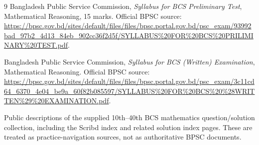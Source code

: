 \documentclass[12pt,a4paper,oneside]{book}
\begin{document}
\begin{thebibliography}{9}
Bangladesh Public Service Commission, \emph{Syllabus for BCS Preliminary Test}, Mathematical Reasoning, 15 marks. Official BPSC source: \url{https://bpsc.gov.bd/sites/default/files/files/bpsc.portal.gov.bd/psc_exam/93992bad_97b2_4d13_84eb_902cc36f2d5f/SYLLABUS%20FOR%20BCS%20PRILIMINARY%20TEST.pdf}.

Bangladesh Public Service Commission, \emph{Syllabus for BCS (Written) Examination}, Mathematical Reasoning. Official BPSC source: \url{https://bpsc.gov.bd/sites/default/files/files/bpsc.portal.gov.bd/psc_exam/3c11cd64_6370_4e04_be9a_60f82b085597/SYLLABUS%20FOR%20BCS%20%28WRITTEN%29%20EXAMINATION.pdf}.

Public descriptions of the supplied 10th--40th BCS mathematics question/solution collection, including the Scribd index and related solution index pages. These are treated as practice-navigation sources, not as authoritative BPSC documents.
\end{thebibliography}
\end{document}
